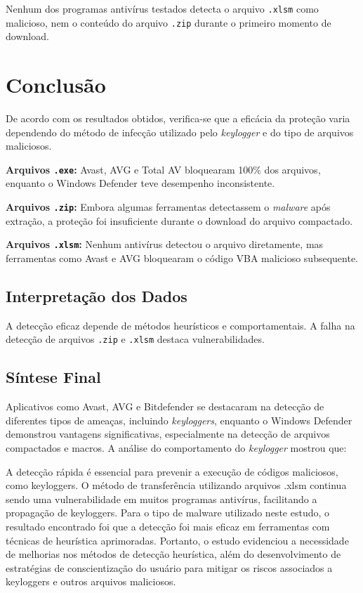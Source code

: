 \documentclass[12pt]{article}
\begin{document}
Nenhum dos programas antivírus testados detecta o arquivo \texttt{.xlsm} como malicioso, nem o conteúdo do arquivo \texttt{.zip} durante o primeiro momento de download.

\section{Conclusão}

De acordo com os resultados obtidos, verifica-se que a eficácia da proteção varia dependendo do método de infecção utilizado pelo \textit{keylogger} e do tipo de arquivos maliciosos.

\noindent\textbf{Arquivos \texttt{.exe}:} Avast, AVG e Total AV bloquearam 100\% dos arquivos, enquanto o Windows Defender teve desempenho inconsistente.

\noindent\textbf{Arquivos \texttt{.zip}:} Embora algumas ferramentas detectassem o \textit{malware} após extração, a proteção foi insuficiente durante o download do arquivo compactado.

\noindent\textbf{Arquivos \texttt{.xlsm}:} Nenhum antivírus detectou o arquivo diretamente, mas ferramentas como Avast e AVG bloquearam o código VBA malicioso subsequente.

\subsection*{Interpretação dos Dados}
A detecção eficaz depende de métodos heurísticos e comportamentais. A falha na detecção de arquivos \texttt{.zip} e \texttt{.xlsm} destaca vulnerabilidades.

\subsection*{Síntese Final}
Aplicativos como Avast, AVG e Bitdefender se destacaram na detecção de diferentes tipos de ameaças, incluindo \textit{keyloggers}, enquanto o Windows Defender demonstrou vantagens significativas, especialmente na detecção de arquivos compactados e macros. A análise do comportamento do \textit{keylogger} mostrou que:

A detecção rápida é essencial para prevenir a execução de códigos maliciosos, como keyloggers. 
O método de transferência utilizando arquivos .xlsm continua sendo uma vulnerabilidade em muitos 
programas antivírus, facilitando a propagação de keyloggers. Para o tipo de malware utilizado neste 
estudo, o resultado encontrado foi que a detecção foi mais eficaz em ferramentas com técnicas de 
heurística aprimoradas. Portanto, o estudo evidenciou a necessidade de melhorias nos métodos de detecção 
heurística, além do desenvolvimento de estratégias de conscientização do usuário para mitigar os riscos associados a keyloggers e outros arquivos maliciosos.




\end{document}
